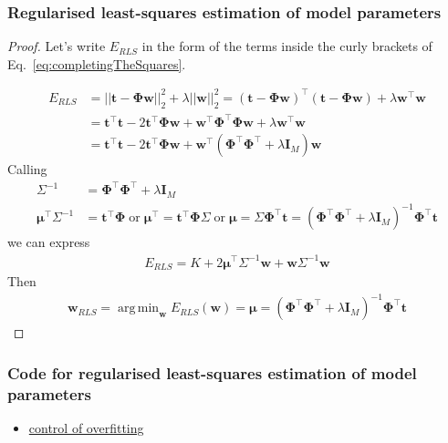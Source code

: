 \documentclass{beamer}
\DeclareMathOperator*{\argmin}{arg\,min}
\begin{document}
\begin{frame}
    \frametitle{Regularised least-squares estimation of model parameters}
	\tiny
		\begin{proof}
			Let's write $E_{RLS}$ in the form of the terms inside the curly brackets of Eq.~\ref{eq:completingTheSquares}.

		\begin{align*}
			E_{RLS}&=||\mathbf{t}-\boldsymbol{\Phi}\mathbf{w}||_2^2+\lambda||\mathbf{w}||_2^2=(\mathbf{t}-\boldsymbol{\Phi}\mathbf{w})^\intercal(\mathbf{t}-\boldsymbol{\Phi}\mathbf{w})+\lambda\mathbf{w}^\intercal\mathbf{w}\\
                   &=\mathbf{t}^\intercal\mathbf{t}-2\mathbf{t}^\intercal\boldsymbol{\Phi}\mathbf{w}+\mathbf{w}^\intercal\boldsymbol{\Phi}^\intercal\boldsymbol{\Phi}\mathbf{w}+\lambda\mathbf{w}^\intercal\mathbf{w}\\
                   &=\mathbf{t}^\intercal\mathbf{t}-2\mathbf{t}^\intercal\boldsymbol{\Phi}\mathbf{w}+\mathbf{w}^\intercal(\boldsymbol{\Phi}^\intercal\boldsymbol{\Phi}^\intercal+\lambda\mathbf{I}_M)\mathbf{w}
		\end{align*}
		Calling
		\begin{align*}
			\Sigma^{-1}&=\boldsymbol{\Phi}^\intercal\boldsymbol{\Phi}^\intercal+\lambda\mathbf{I}_M\\
			\boldsymbol{\mu}^\intercal\Sigma^{-1}&=\mathbf{t}^\intercal\boldsymbol{\Phi}\;\text{or}\;\boldsymbol{\mu}^\intercal=\mathbf{t}^\intercal\boldsymbol{\Phi}\Sigma\;\text{or}\;\boldsymbol{\mu}=\Sigma\boldsymbol{\Phi}^\intercal\mathbf{t}=\left(\boldsymbol{\Phi}^\intercal\boldsymbol{\Phi}^\intercal+\lambda\mathbf{I}_M\right)^{-1}\boldsymbol{\Phi}^\intercal\mathbf{t}
		\end{align*}
		we can express
		\begin{align*}
			E_{RLS}=K+2\boldsymbol{\mu}^\intercal\Sigma^{-1}\mathbf{w}+\mathbf{w}\Sigma^{-1}\mathbf{w}
		\end{align*}
		Then
		\begin{align*}
			 \mathbf{w}_{RLS}=\argmin_{\mathbf{w}}E_{RLS}(\mathbf{w})=\boldsymbol{\mu}=\left(\boldsymbol{\Phi}^\intercal\boldsymbol{\Phi}^\intercal+\lambda\mathbf{I}_M\right)^{-1}\boldsymbol{\Phi}^\intercal\mathbf{t} 
		\end{align*}
		\end{proof}
	\normalsize
\end{frame}

\begin{frame}
    \frametitle{Code for regularised least-squares estimation of model parameters}
    \begin{itemize}
        \item \href{file:///nfs/ghome/live/rapela/dev/teaching/gcnuBridging2023/repo/docs/sphinx/build/html/auto\_examples/bayesianLinearRegression/plotRegularizedLeastSquares.html\#sphx-glr-auto-examples-bayesianlinearregression-plotregularizedleastsquares-py}{control of overfitting}
    \end{itemize}
\end{frame}
\end{document}
